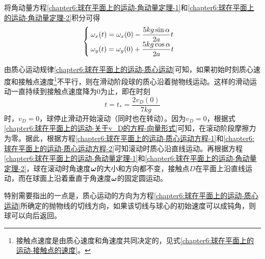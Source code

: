 将角动量方程\eqref{chapter6:球在平面上的运动-角动量定理-1}和\eqref{chapter6:球在平面上的运动-角动量定理-2}积分可得
\begin{equation}
\begin{cases}
	\displaystyle \omega_x(t) = \omega_x(0) - \frac{5kg\sin\alpha}{2a}t \\
	\displaystyle \omega_y(t) = \omega_y(0) + \frac{5kg\cos\alpha}{2a}t
\end{cases}
\end{equation}

由质心运动规律\eqref{chapter6:球在平面上的运动-质心运动}可知，如果初始时刻质心速度和接触点速度\footnote{接触点速度是由质心速度和角速度共同决定的，见式\eqref{chapter6:球在平面上的运动-接触点的速度}。}不平行，则在滑动阶段球的质心沿着抛物线运动。这样的滑动运动一直持续到接触点速度降为$0$为止，即在时刻
\begin{equation}
	t = t_* = \frac{2v_D(0)}{7kg}
\end{equation}
时，$v_D=0$，球停止滑动开始滚动（同时也在转动）。因为$v_D=0$，根据式\eqref{chapter6:球在平面上的运动-关于v_D的方程-向量形式}可知，在滚动阶段摩擦力为零。据此，根据方程\eqref{chapter6:球在平面上的运动-质心运动方程-1}和\eqref{chapter6:球在平面上的运动-质心运动方程-2}可知滚动时质心沿直线运动。再根据方程\eqref{chapter6:球在平面上的运动-角动量定理-1}和\eqref{chapter6:球在平面上的运动-角动量定理-2}，球在滚动时角速度$\boldsymbol{\omega}$的大小和方向都不变，接触点$D$在平面上沿直线运动，而在球面上沿着垂直于角速度$\boldsymbol{\omega}$的固定圆运动。

特别需要指出的一点是，质心运动的方向为方程\eqref{chapter6:球在平面上的运动-质心运动}所确定的抛物线的切线方向，如果该切线与球心的初始速度可以成钝角，则球可以向后返回。